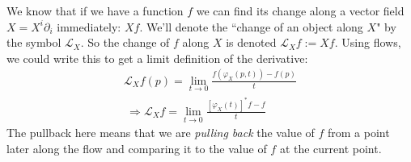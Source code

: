 		


		
		
		
	We know that if we have a function $f$ we can find its change along a vector field $X = X^i \partial_i$ immediately: $Xf$. We'll denote the ``change of an object along $X$" by the symbol $\mathcal L_X$. So the change of $f$ along $X$ is denoted $\mathcal L_X f := Xf$. Using flows, we could write this to get a limit definition of the derivative:
		\begin{align*}
			\mathcal L_X f(p) = \lim_{t \rightarrow 0} \frac{f(\varphi_X(p,t)) - f(p)}{t}\\\
			\Rightarrow \mathcal L_X f = \lim_{t \rightarrow 0} \frac{[\varphi_X(t)]^* f - f}{t}
		\end{align*}
		The pullback here means that we are \emph{pulling back} the value of $f$ from a point later along the flow and comparing it to the value of $f$ at the current point.
		
